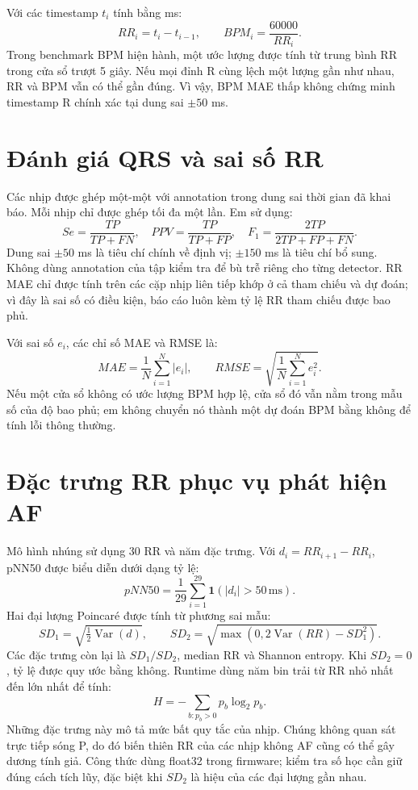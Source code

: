 \documentclass[12pt,a4paper,oneside]{report}
\begin{document}
Với các timestamp $t_i$ tính bằng ms:
\begin{equation}
RR_i=t_i-t_{i-1},\qquad BPM_i=\frac{60000}{RR_i}.
\end{equation}
Trong benchmark BPM hiện hành, một ước lượng được tính từ trung bình RR trong cửa sổ trượt 5 giây. Nếu mọi đỉnh R cùng lệch một lượng gần như nhau, RR và BPM vẫn có thể gần đúng. Vì vậy, BPM MAE thấp không chứng minh timestamp R chính xác tại dung sai $\pm50$ ms.

\section{Đánh giá QRS và sai số RR}
Các nhịp được ghép một-một với annotation trong dung sai thời gian đã khai báo. Mỗi nhịp chỉ được ghép tối đa một lần. Em sử dụng:
\begin{equation}
Se=\frac{TP}{TP+FN},\quad PPV=\frac{TP}{TP+FP},\quad
F_1=\frac{2TP}{2TP+FP+FN}.
\end{equation}
Dung sai $\pm50$ ms là tiêu chí chính về định vị; $\pm150$ ms là tiêu chí bổ sung. Không dùng annotation của tập kiểm tra để bù trễ riêng cho từng detector. RR MAE chỉ được tính trên các cặp nhịp liên tiếp khớp ở cả tham chiếu và dự đoán; vì đây là sai số có điều kiện, báo cáo luôn kèm tỷ lệ RR tham chiếu được bao phủ.

Với sai số $e_i$, các chỉ số MAE và RMSE là:
\begin{equation}
MAE=\frac{1}{N}\sum_{i=1}^{N}|e_i|,\qquad
RMSE=\sqrt{\frac{1}{N}\sum_{i=1}^{N}e_i^2}.
\end{equation}
Nếu một cửa sổ không có ước lượng BPM hợp lệ, cửa sổ đó vẫn nằm trong mẫu số của độ bao phủ; em không chuyển nó thành một dự đoán BPM bằng không để tính lỗi thông thường.

\section{Đặc trưng RR phục vụ phát hiện AF}
Mô hình nhúng sử dụng 30 RR và năm đặc trưng. Với $d_i=RR_{i+1}-RR_i$, pNN50 được biểu diễn dưới dạng tỷ lệ:
\begin{equation}
pNN50=\frac{1}{29}\sum_{i=1}^{29}\mathbf{1}(|d_i|>50\,\mathrm{ms}).
\end{equation}
Hai đại lượng Poincaré được tính từ phương sai mẫu:
\begin{equation}
SD_1=\sqrt{\tfrac12\operatorname{Var}(d)},\qquad
SD_2=\sqrt{\max(0,2\operatorname{Var}(RR)-SD_1^2)}.
\end{equation}
Các đặc trưng còn lại là $SD_1/SD_2$, median RR và Shannon entropy. Khi $SD_2=0$, tỷ lệ được quy ước bằng không. Runtime dùng năm bin trải từ RR nhỏ nhất đến lớn nhất để tính:
\begin{equation}
H=-\sum_{b:p_b>0}p_b\log_2p_b.
\end{equation}
Những đặc trưng này mô tả mức bất quy tắc của nhịp. Chúng không quan sát trực tiếp sóng P, do đó biến thiên RR của các nhịp không AF cũng có thể gây dương tính giả. Công thức dùng float32 trong firmware; kiểm tra số học cần giữ đúng cách tích lũy, đặc biệt khi $SD_2$ là hiệu của các đại lượng gần nhau.
\end{document}
